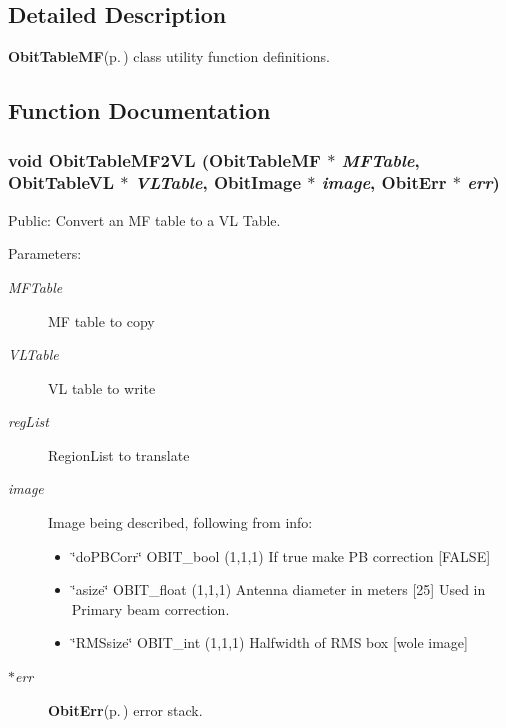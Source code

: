 \subsection{Detailed Description}
{\bf Obit\-Table\-MF}{\rm (p.\,\pageref{structObitTableMF})} class utility function definitions. 



\subsection{Function Documentation}
\subsubsection{\setlength{\rightskip}{0pt plus 5cm}void Obit\-Table\-MF2VL ({\bf Obit\-Table\-MF} $\ast$ {\em MFTable}, {\bf Obit\-Table\-VL} $\ast$ {\em VLTable}, {\bf Obit\-Image} $\ast$ {\em image}, {\bf Obit\-Err} $\ast$ {\em err})}\label{ObitTableMFUtil_8c_a4}


Public: Convert an MF table to a VL Table. 

\begin{Desc}
\item[Parameters:]
\begin{description}
\item[{\em MFTable}]MF table to copy \item[{\em VLTable}]VL table to write \item[{\em reg\-List}]Region\-List to translate \item[{\em image}]Image being described, following from info: \begin{itemize}
\item \char`\"{}do\-PBCorr\char`\"{} OBIT\_\-bool (1,1,1) If true make PB correction [FALSE] \item \char`\"{}asize\char`\"{} OBIT\_\-float (1,1,1) Antenna diameter in meters [25] Used in Primary beam correction. \item \char`\"{}RMSsize\char`\"{} OBIT\_\-int (1,1,1) Halfwidth of RMS box [wole image] \end{itemize}
\item[{\em $\ast$err}]{\bf Obit\-Err}{\rm (p.\,\pageref{structObitErr})} error stack. \end{description}
\end{Desc}
